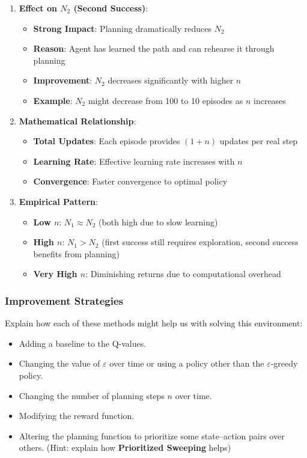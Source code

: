 \begin{itemize}
\begin{enumerate}
        \item \textbf{Effect on $N_2$ (Second Success)}:
        \begin{itemize}
            \item \textbf{Strong Impact}: Planning dramatically reduces $N_2$
            \item \textbf{Reason}: Agent has learned the path and can rehearse it through planning
            \item \textbf{Improvement}: $N_2$ decreases significantly with higher $n$
            \item \textbf{Example}: $N_2$ might decrease from 100 to 10 episodes as $n$ increases
        \end{itemize}
        
        \item \textbf{Mathematical Relationship}:
        \begin{itemize}
            \item \textbf{Total Updates}: Each episode provides $(1+n)$ updates per real step
            \item \textbf{Learning Rate}: Effective learning rate increases with $n$
            \item \textbf{Convergence}: Faster convergence to optimal policy
        \end{itemize}
        
        \item \textbf{Empirical Pattern}:
        \begin{itemize}
            \item \textbf{Low $n$}: $N_1 \approx N_2$ (both high due to slow learning)
            \item \textbf{High $n$}: $N_1 > N_2$ (first success still requires exploration, second success benefits from planning)
            \item \textbf{Very High $n$}: Diminishing returns due to computational overhead
        \end{itemize}
    \end{enumerate}
\end{itemize}

\vspace*{0.3cm}
\subsubsection{Improvement Strategies}
Explain how each of these methods might help us with solving this environment:
\begin{itemize} 
    \item Adding a baseline to the Q-values. 
    \item Changing the value of $\varepsilon$ over time or using a policy other than the $\varepsilon$-greedy policy. 
    \item Changing the number of planning steps $n$ over time. 
    \item Modifying the reward function. 
    \item Altering the planning function to prioritize some state–action pairs over others. (Hint: explain how \textbf{Prioritized Sweeping} helps) 
\end{itemize}